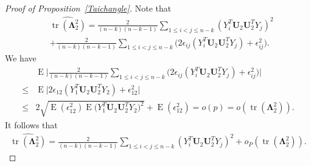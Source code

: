 \documentclass[12pt]{article} %
\DeclareMathOperator{\mytr}{tr}
\DeclareMathOperator{\myE}{E}
\newcommand{\bU}{\mathbf{U}}
\newcommand{\bfsym}[1]{\ensuremath{\boldsymbol{#1}}}
\def\bLambda {\bfsym {\Lambda}}
\theoremstyle{definition}
\begin{document}
\begin{appendices}
\begin{proof}[Proof of Proposition~\ref{Taichangle}]
        Note that
    $$
        \begin{aligned}
            &\widehat{\mytr(\bLambda_2^2)}
            =
        \frac{2}{(n-k)(n-k-1)}\sum_{1\leq i<j\leq n-k}(Y_i^T \bU_2 \bU_2^T Y_j)^2 \\
            &+
            \frac{2}{(n-k)(n-k-1)}\sum_{1\leq i<j\leq n-k}\big(2\epsilon_{ij}(Y_i^T \bU_2 \bU_2^T Y_j)
            + \epsilon_{ij}^2\big).
        \end{aligned}
    $$
        We have
        $$
            \begin{aligned}
                &\myE\Big|\frac{2}{(n-k)(n-k-1)}\sum_{1\leq i<j\leq n-k}\big(2\epsilon_{ij}(Y_i^T \bU_2 \bU_2^T Y_j)
                +
                \epsilon_{ij}^2\big)\Big|\\
                \leq&
                \myE\Big|2\epsilon_{12}(Y_1^T \bU_2 \bU_2^T Y_2)
            +
            \epsilon_{12}^2\Big|\\
            \leq&
                2\sqrt{\myE (\epsilon_{12}^2)\myE\big(Y_1^T \bU_2 \bU_2^T Y_2\big)^2}
            +
                \myE (\epsilon_{12}^2)=o(p)=o(\mytr(\bLambda_2^2)).
        \end{aligned}
    $$
    It follows that
$$
    \begin{aligned}
        \widehat{\mytr(\bLambda_2^2)}
        =
    \frac{2}{(n-k)(n-k-1)}\sum_{1\leq i<j\leq n-k}(Y_i^T \bU_2 \bU_2^T Y_j)^2 
        +o_P(\mytr(\bLambda_2^2)).
    \end{aligned}
$$


\end{proof}
\end{appendices}
\end{document}
